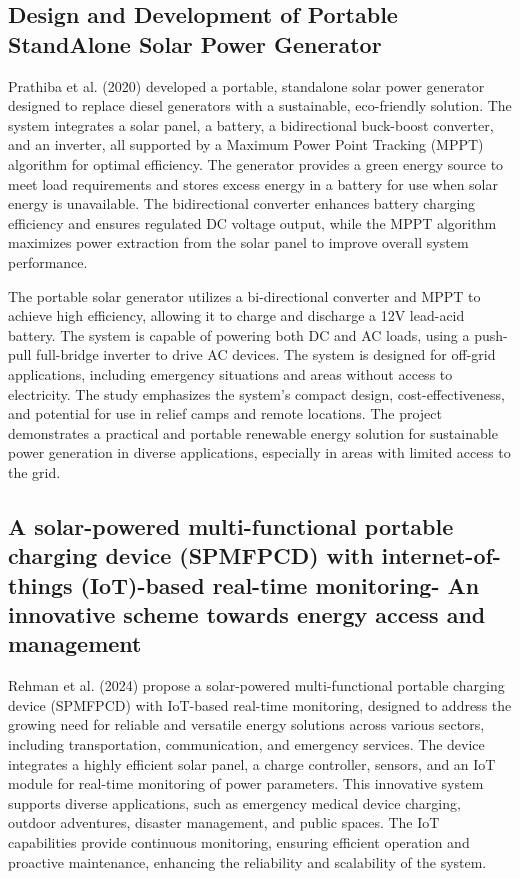 {\subsection{Design and Development of Portable StandAlone Solar Power Generator }

Prathiba et al. (2020) developed a portable, standalone solar power generator designed to replace diesel generators with a sustainable, eco-friendly solution. The system integrates a solar panel, a battery, a bidirectional buck-boost converter, and an inverter, all supported by a Maximum Power Point Tracking (MPPT) algorithm for optimal efficiency. The generator provides a green energy source to meet load requirements and stores excess energy in a battery for use when solar energy is unavailable. The bidirectional converter enhances battery charging efficiency and ensures regulated DC voltage output, while the MPPT algorithm maximizes power extraction from the solar panel to improve overall system performance.

The portable solar generator utilizes a bi-directional converter and MPPT to achieve high efficiency, allowing it to charge and discharge a 12V lead-acid battery. The system is capable of powering both DC and AC loads, using a push-pull full-bridge inverter to drive AC devices. The system is designed for off-grid applications, including emergency situations and areas without access to electricity. The study emphasizes the system's compact design, cost-effectiveness, and potential for use in relief camps and remote locations. The project demonstrates a practical and portable renewable energy solution for sustainable power generation in diverse applications, especially in areas with limited access to the grid.

\subsection{A solar-powered multi-functional portable charging device (SPMFPCD) with internet-of-things (IoT)-based real-time monitoring- An innovative scheme towards energy access and management}

Rehman et al. (2024) propose a solar-powered multi-functional portable charging device (SPMFPCD) with IoT-based real-time monitoring, designed to address the growing need for reliable and versatile energy solutions across various sectors, including transportation, communication, and emergency services. The device integrates a highly efficient solar panel, a charge controller, sensors, and an IoT module for real-time monitoring of power parameters. This innovative system supports diverse applications, such as emergency medical device charging, outdoor adventures, disaster management, and public spaces. The IoT capabilities provide continuous monitoring, ensuring efficient operation and proactive maintenance, enhancing the reliability and scalability of the system.

}
